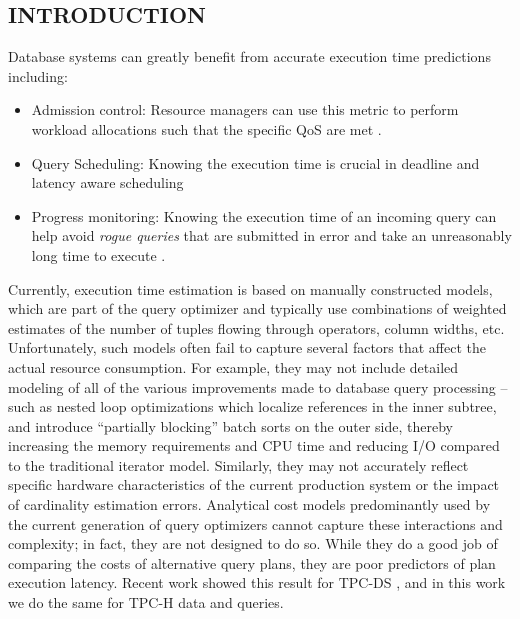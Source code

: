 \documentclass{article}
\begin{document}
	\begin{multicols}{2}
	\section{INTRODUCTION}
	Database systems can greatly benefit from accurate execution time predictions including: 
	\begin{itemize}
	\item Admission control: Resource managers can use this metric to perform workload allocations such that the specific QoS are met \cite{activeSLA}.
	\item Query Scheduling: Knowing the execution time is crucial in deadline and latency aware 			scheduling
	\item Progress monitoring: Knowing the execution time of an incoming query can help avoid \textit{rogue queries} that are submitted in error and take an unreasonably long time to execute \cite{progress}.
	\end{itemize}
	Currently, execution time estimation is based on manually constructed
	models, which are part of the query optimizer and typically use
	combinations of weighted estimates of the number of tuples flowing
	through operators, column widths, etc. Unfortunately, such
	models often fail to capture several factors that affect the actual
	resource consumption. For example, they may not include detailed
	modeling of all of the various improvements made to database query
	processing – such as nested loop optimizations \cite{ganapathi, adaptive} which localize
	references in the inner subtree, and introduce “partially blocking”
	batch sorts on the outer side, thereby increasing the memory
	requirements and CPU time and reducing I/O compared to the traditional
	iterator model. Similarly, they may not accurately reflect
	specific hardware characteristics of the current production system
	or the impact of cardinality estimation errors. Analytical cost models predominantly 
	used by the current generation of query optimizers cannot
	capture these interactions and complexity; in fact, they are not designed to do so. 
	While they do a good job of comparing the costs of alternative query plans,
	they are poor predictors of plan execution latency. 
	Recent work \cite{ganapathi} showed this result for TPC-DS \cite{TPCDS}, and 
	in this work we do the same for TPC-H \cite{TPCH} data and queries.
	

\end{multicols}
\end{document}
